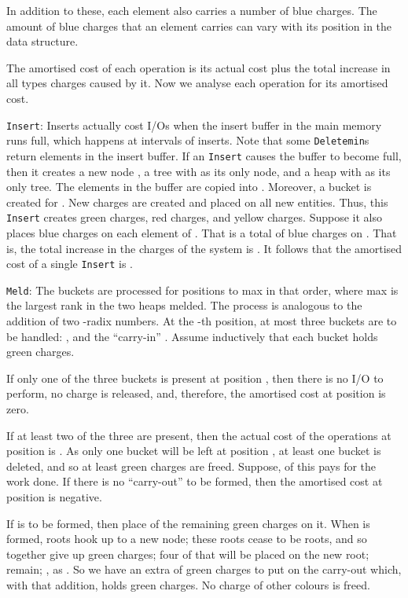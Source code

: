 In addition to these, each element also carries a number of blue charges.
The amount of blue charges that an element carries can vary with its position
in the data structure.

The amortised cost of each operation is its actual cost plus
the total increase in all types charges caused by it.
Now we analyse each operation for its amortised cost.

{\tt Insert}:
Inserts actually cost  I/Os when the insert buffer in the main memory runs full,
which happens at intervals of  inserts.
Note that some {\tt Deletemin}s return elements in the insert buffer.
If an {\tt Insert} causes the buffer to become full, 
then it creates a new node , a tree  with  as its only node, and
a heap  with  as its only tree. The  elements in the buffer
are copied into . Moreover, a bucket is created for .
New charges are created and placed on all new entities.
Thus, this {\tt Insert} creates  green charges,  red charges,
and  yellow charges. Suppose it also places  blue charges
on each element of . That is a total of 
 blue charges on . 
That is, the total increase in the charges of the system is
. 
It follows that the amortised cost of a single {\tt Insert} is
. 

{\tt Meld}:
The buckets are processed for positions  to max in that order, where
max is the largest rank in the two heaps melded. The process is
analogous to the addition of two -radix numbers.
At the -th position, at most three buckets are to be handled:
,  and the ``carry-in'' . 
Assume inductively that each bucket holds
 green charges. 

If only one of the three buckets is present at
position , then there is no I/O to perform, no charge is released, and, therefore,
the amortised cost at position  is zero. 

If at least two of the three are present,
then the actual cost of the operations at position  is .
As only one bucket will be left at position , at least one bucket is
deleted, and so at least  green charges are freed. Suppose,  of this 
pays for the work done. If there is no ``carry-out''  to be formed,
then the amortised cost at position  is negative.

If  is to be formed, then
place  of the remaining green charges
on it. When  is formed,  roots hook
up to a new node; these roots cease to be roots, and so together give 
up  green charges; four of that will be placed on the new root; 
 remain; , as . 
So we have an extra of  green charges to put on the carry-out
which, with that addition, holds  green charges. No charge of other colours is freed.

